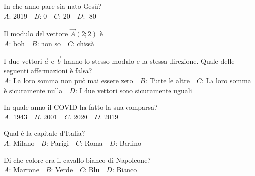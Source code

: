 \mcpaperfooter

\def\mcserialnumber{19}
\mcpaperheader


\def\mcquestionnumber{1}


\mcquestionheader In che anno pare sia nato Gesù?\\
{$A$}: 2019\ \ {$B$}: 0\ \ {$C$}: 20\ \ {$D$}: -80\ \ 

\mcquestionfooter



\def\mcquestionnumber{2}


\mcquestionheader Il modulo del vettore $\vec{A}(2;2)$ è\\
{$A$}: boh\ \ {$B$}: non so\ \ {$C$}: chissà\ \ 

\mcquestionfooter



\def\mcquestionnumber{3}


\mcquestionheader I due vettori $\vec{a}$ e $\vec{b}$ hanno lo stesso modulo e la stessa direzione. Quale delle seguenti affermazioni è falsa?\\
{$A$}: La loro somma non può mai essere zero\ \ {$B$}: Tutte le altre\ \ {$C$}: La loro somma è sicuramente nulla\ \ {$D$}: I due vettori sono sicuramente uguali\ \ 

\mcquestionfooter



\def\mcquestionnumber{4}


\mcquestionheader In quale anno il COVID ha fatto la sua comparsa?\\
{$A$}: 1943\ \ {$B$}: 2001\ \ {$C$}: 2020\ \ {$D$}: 2019\ \ 

\mcquestionfooter



\def\mcquestionnumber{5}


\mcquestionheader Qual è la capitale d’Italia?\\
{$A$}: Milano\ \ {$B$}: Parigi\ \ {$C$}: Roma\ \ {$D$}: Berlino\ \ 

\mcquestionfooter



\def\mcquestionnumber{6}


\mcquestionheader Di che colore era il cavallo bianco di Napoleone?\\
{$A$}: Marrone\ \ {$B$}: Verde\ \ {$C$}: Blu\ \ {$D$}: Bianco\ \ 

\mcquestionfooter



\def\mcquestionnumber{7}



